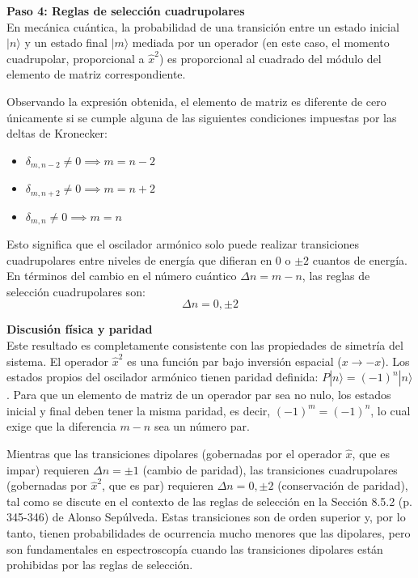 \documentclass[a4paper]{article}
\begin{document}
\vspace{0.3cm}
\noindent\textbf{Paso 4: Reglas de selección cuadrupolares} \\
En mecánica cuántica, la probabilidad de una transición entre un estado inicial $|n\rangle$ y un estado final $|m\rangle$ mediada por un operador (en este caso, el momento cuadrupolar, proporcional a $\hat{x}^2$) es proporcional al cuadrado del módulo del elemento de matriz correspondiente. 

Observando la expresión obtenida, el elemento de matriz es diferente de cero únicamente si se cumple alguna de las siguientes condiciones impuestas por las deltas de Kronecker:
\begin{itemize}
    \item $\delta_{m, n-2} \neq 0 \implies m = n - 2$
    \item $\delta_{m, n+2} \neq 0 \implies m = n + 2$
    \item $\delta_{m, n} \neq 0 \implies m = n$
\end{itemize}

Esto significa que el oscilador armónico solo puede realizar transiciones cuadrupolares entre niveles de energía que difieran en $0$ o $\pm 2$ cuantos de energía. En términos del cambio en el número cuántico $\Delta n = m - n$, las reglas de selección cuadrupolares son:
$$
\Delta n = 0, \pm 2
$$

\vspace{0.3cm}
\noindent\textbf{Discusión física y paridad} \\
Este resultado es completamente consistente con las propiedades de simetría del sistema. El operador $\hat{x}^2$ es una función par bajo inversión espacial ($x \to -x$). Los estados propios del oscilador armónico tienen paridad definida: $P|n\rangle = (-1)^n |n\rangle$. Para que un elemento de matriz de un operador par sea no nulo, los estados inicial y final deben tener la misma paridad, es decir, $(-1)^m = (-1)^n$, lo cual exige que la diferencia $m - n$ sea un número par. 

Mientras que las transiciones dipolares (gobernadas por el operador $\hat{x}$, que es impar) requieren $\Delta n = \pm 1$ (cambio de paridad), las transiciones cuadrupolares (gobernadas por $\hat{x}^2$, que es par) requieren $\Delta n = 0, \pm 2$ (conservación de paridad), tal como se discute en el contexto de las reglas de selección en la Sección 8.5.2 (p. 345-346) de Alonso Sepúlveda. Estas transiciones son de orden superior y, por lo tanto, tienen probabilidades de ocurrencia mucho menores que las dipolares, pero son fundamentales en espectroscopía cuando las transiciones dipolares están prohibidas por las reglas de selección.
\end{document}
